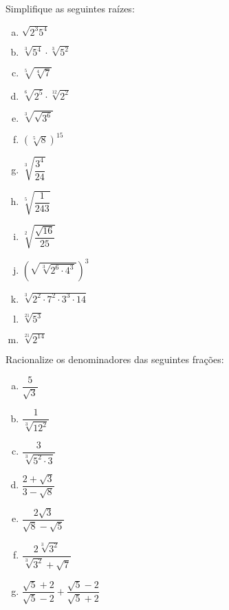 \begin{exer}
Simplifique as seguintes raízes:
\begin{multicols}{2}
\begin{enumerate}[a)]
\item $\sqrt{2^3 5^4}$
\item $\sqrt[3]{5^4} \cdot \sqrt[3]{5^2}$
\item $\sqrt[5]{\sqrt[4]{7}}$
\item $\sqrt[6]{2^5} \cdot \sqrt[12]{2^2}$
\item $\sqrt[3]{\sqrt{3^6}}$
\item $(\sqrt[5]{8})^{15}$
\item $\sqrt[3]{\dfrac{3^4}{24}}$
\item $\sqrt[5]{\dfrac{1}{243}}$
\item $\sqrt[2]{\dfrac{\sqrt{16}}{25}}$
\item $(\sqrt{\sqrt[3]{2^6 \cdot 4^3}})^3$
\item $\sqrt[3]{2^2 \cdot 7^2 \cdot 3^3 \cdot 14}$
\item $\sqrt[21]{5^3}$
\item $\sqrt[21]{2^{14}}$

\end{enumerate}
\end{multicols}
\end{exer}
\begin{resp}
  \construirResp
\end{resp}

\begin{exer}
Racionalize os denominadores das seguintes frações:
\begin{multicols}{2}
\begin{enumerate}[a)]
\item $\dfrac{5}{\sqrt{3}}$
\item $\dfrac{1}{\sqrt[3]{12^2}}$
\item $\dfrac{3}{\sqrt[3]{5^2 \cdot 3}}$
\item $\dfrac{2 + \sqrt{3}}{3 - \sqrt{8}}$
\item $\dfrac{2\sqrt{3}}{\sqrt{8} - \sqrt{5}}$
\item $\dfrac{2 \sqrt[3]{3^2}}{\sqrt[3]{3^2} + \sqrt{7}}$
\item $\dfrac{\sqrt{5} + 2}{\sqrt{5} - 2} + \dfrac{\sqrt{5} - 2}{\sqrt{5} + 2}$
\end{enumerate}
\end{multicols}
\end{exer}
\begin{resp}
  \construirResp
\end{resp}


